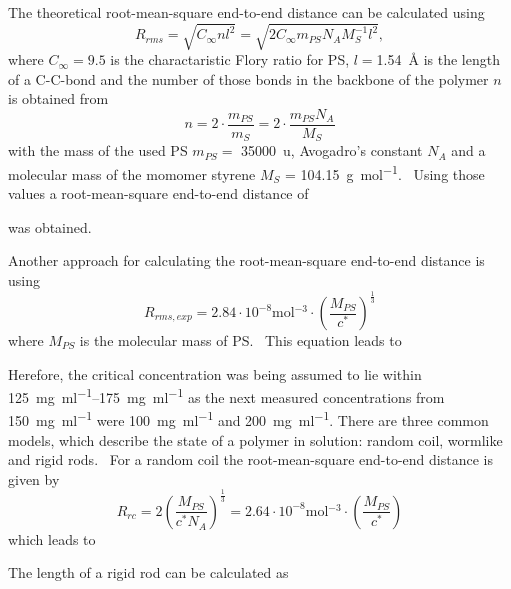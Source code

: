 The theoretical root-mean-square end-to-end distance can be calculated using 
\begin{equation}
    R_{rms} = \sqrt{C_{\infty}nl^2} = \sqrt{2C_{\infty}m_{PS}N_AM_S^{-1}l^2},
\end{equation}
where $C_{\infty} = 9.5$ is the charactaristic Flory ratio for PS, $l =$\SI{1.54}{\angstrom} is the length of a C-C-bond and the number of those bonds in the backbone of the polymer $n$ is obtained from 
\begin{equation}
    n = 2 \cdot \frac{m_{PS}}{m_S} = 2 \cdot \frac{m_{PS}N_A}{M_S}
\end{equation}
with the mass of the used PS $m_{PS} = $ \SI{35000}{\atomicmassunit}, Avogadro's constant $N_A$ and a molecular mass of the momomer styrene $M_S$ = \SI{104.15}{\gram\per\mol}.~\cite{Fetters.2007,Styrol} Using those values a root-mean-square end-to-end distance of \par
\centerline{} \par 
was obtained. \par
Another approach for calculating the root-mean-square end-to-end distance is using 
\begin{equation}
    R_{rms,exp} = 2.84 \cdot 10^{-8} \si{\mol^{-3}} \cdot (\frac{M_{PS}}{c^*})^\frac{1}{3}
\end{equation}
where $M_{PS}$ is the molecular mass of PS.~\cite{Daum.1969} This equation leads to \par 
\centerline{} \par
Herefore, the critical concentration was being assumed to lie within \SIrange{125}{175}{\milli\gram\per\milli\litre} as the next measured concentrations from \SI{150}{\milli\gram\per\milli\litre} were \SI{100}{\milli\gram\per\milli\litre} and \SI{200}{\milli\gram\per\milli\litre}. 
There are three common models, which describe the state of a polymer in solution: random coil, wormlike and rigid rods.~\cite{Ying.1987} For a random coil the root-mean-square end-to-end distance is given by \begin{equation}
    R_{rc} = 2 (\frac{M_{PS}}{c^*N_A})^\frac{1}{3} = 2.64 \cdot 10^{-8} \si{\mol^{-3}} \cdot (\frac{M_{PS}}{c^*})
\end{equation}
which leads to \par 
\centerline{} \par
The length of a rigid rod can be calculated as
